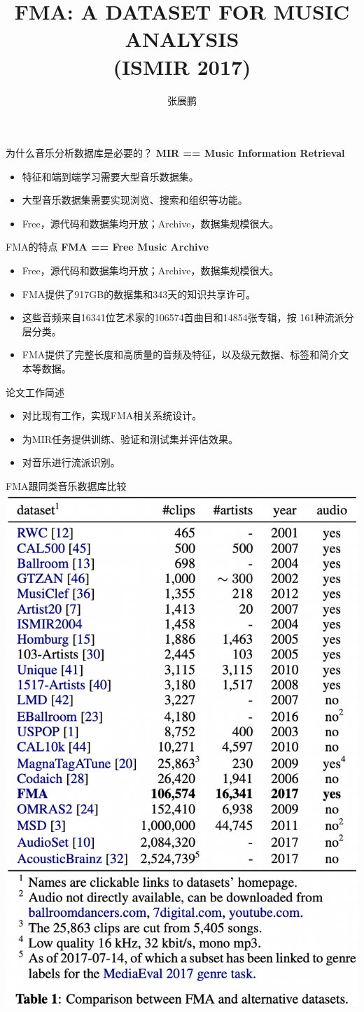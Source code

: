 \documentclass{beamer}
\title{FMA: A DATASET FOR MUSIC ANALYSIS\\(ISMIR 2017)}
\author{张展鹏}
\begin{document}
\begin{frame}[plain]
    \maketitle
\end{frame}

\begin{frame}{为什么音乐分析数据库是必要的？}
	\textbf{MIR == Music Information Retrieval}
	\begin{itemize}
		\item 特征和端到端学习需要大型音乐数据集。
		\item 大型音乐数据集需要实现浏览、搜索和组织等功能。
		\item Free，源代码和数据集均开放；Archive，数据集规模很大。
	\end{itemize}
\end{frame}

\begin{frame}{FMA的特点}
	\textbf{FMA == Free Music Archive}
	\begin{itemize}
		\item Free，源代码和数据集均开放；Archive，数据集规模很大。
		\item FMA提供了917GB的数据集和343天的知识共享许可。
		\item 这些音频来自16341位艺术家的106574首曲目和14854张专辑，按 161种流派分层分类。
		\item FMA提供了完整长度和高质量的音频及特征，以及级元数据、标签和简介文本等数据。
	\end{itemize}
\end{frame}

\begin{frame}{论文工作简述}
	\begin{itemize}
		\item 对比现有工作，实现FMA相关系统设计。
		\item 为MIR任务提供训练、验证和测试集并评估效果。
		\item 对音乐进行流派识别。
	\end{itemize}
\end{frame}

\begin{frame}{FMA跟同类音乐数据库比较}
	\includegraphics[width=0.5\linewidth]{Assets/表1}
\end{frame}
\end{document}
